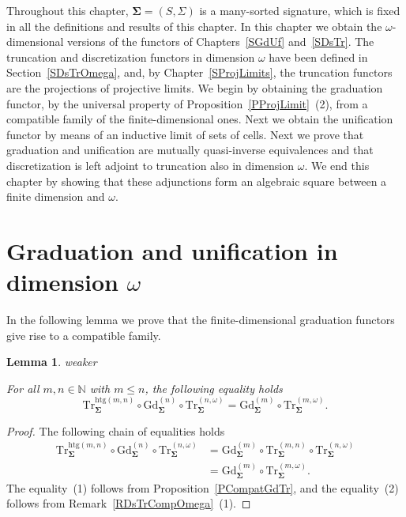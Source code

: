 \documentclass[a4paper, reqno]{amsbook}
\makeatletter
\newcommand{\sig}[1]{\mathbf{#1}}             %
\newcommand{\htg}{\mathrm{htg}}                %
\newcommand{\Gd}{\mathrm{Gd}}
\newcommand{\Tr}{\mathrm{Tr}}
\theoremstyle{plain}
\newtheorem{lemma}[theorem]{Lemma}
\theoremstyle{definition}
\newcommand*{\CA@leanpending}{}
\newcommand*{\CA@leanrelation}{}
\newcommand*{\lean}[2]{%
  \ifcsname\string\color@lean@#1\endcsname\else
    \PackageError{main}{Unknown relation `#1' in \string\lean}{Use equivalent, weaker or stronger.}%
  \fi
  \gdef\CA@leanrelation{#1}%
  \gdef\CA@leanpending{#2}}
\makeatother
\begin{document}
Throughout this chapter, $\sig{\Sigma}=(S,\Sigma)$ is a many-sorted signature, which is fixed in all the definitions and results of this chapter.
In this chapter we obtain the $\omega$-dimensional versions of the functors of Chapters~\ref{SGdUf} and~\ref{SDsTr}.
The truncation and discretization functors in dimension $\omega$ have been defined in Section~\ref{SDsTrOmega}, and, by Chapter~\ref{SProjLimits}, the truncation functors are the projections of projective limits.
We begin by obtaining the graduation functor, by the universal property of Proposition~\ref{PProjLimit}~(2), from a compatible family of the finite-dimensional ones.
Next we obtain the unification functor by means of an inductive limit of sets of cells.
Next we prove that graduation and unification are mutually quasi-inverse equivalences and that discretization is left adjoint to truncation also in dimension $\omega$.
We end this chapter by showing that these adjunctions form an algebraic square between a finite dimension and $\omega$.

\section{Graduation and unification in dimension \texorpdfstring{$\omega$}{omega}}\label{SGdUfOmega}

In the following lemma we prove that the finite-dimensional graduation functors give rise to a compatible family.

\begin{lemma}\label{LCompatGdTrOmega}\lean{weaker}{Omega.graduationFamily}
For all $m,n\in\mathbb{N}$ with $m\leq n$, the following equality holds
$$
\Tr^{\htg(m,n)}_{\sig{\Sigma}}\circ\Gd^{(n)}_{\sig{\Sigma}}\circ \Tr^{(n,\omega)}_{\sig{\Sigma}}=\Gd^{(m)}_{\sig{\Sigma}}\circ \Tr^{(m,\omega)}_{\sig{\Sigma}}.
$$
\end{lemma}
\begin{proof}
The following chain of equalities holds
\begin{align*}
\Tr^{\htg(m,n)}_{\sig{\Sigma}}\circ\Gd^{(n)}_{\sig{\Sigma}}\circ \Tr^{(n,\omega)}_{\sig{\Sigma}}
&=
\Gd^{(m)}_{\sig{\Sigma}}\circ \Tr^{(m,n)}_{\sig{\Sigma}}\circ \Tr^{(n,\omega)}_{\sig{\Sigma}}
\tag{1}
\\&=
\Gd^{(m)}_{\sig{\Sigma}}\circ \Tr^{(m,\omega)}_{\sig{\Sigma}}.
\tag{2}
\end{align*}
The equality~(1) follows from Proposition~\ref{PCompatGdTr}, and the equality~(2) follows from Remark~\ref{RDsTrCompOmega}~(1).
\end{proof}
\end{document}
